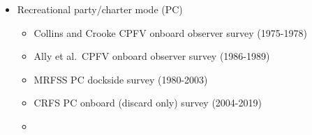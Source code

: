 \documentclass[11pt,
  english,
]{article}
\begin{document}
\begin{itemize}
\item

  Recreational party/charter mode (PC)

  \tagmcend\tagstructend\tagstructend


  \begin{itemize}
  \item


    Collins and Crooke CPFV onboard observer survey (1975-1978)

    \tagmcend\tagstructend\tagstructend

    \tagmcend\tagstructend\tagstructend
  \item


    Ally et al.~CPFV onboard observer survey (1986-1989)

    \tagmcend\tagstructend\tagstructend

    \tagmcend\tagstructend\tagstructend
  \item


    MRFSS PC dockside survey (1980-2003)

    \tagmcend\tagstructend\tagstructend

    \tagmcend\tagstructend\tagstructend
  \item


    CRFS PC onboard (discard only) survey (2004-2019)

    \tagmcend\tagstructend\tagstructend

    \tagmcend\tagstructend\tagstructend
  \item


\end{itemize}
\end{itemize}
\end{document}
